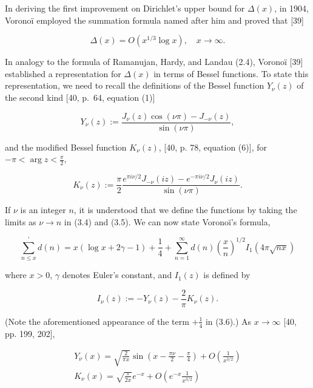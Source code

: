 \documentclass[10pt]{article}
\theoremstyle{plain}
\begin{document}
In deriving the first improvement on Dirichlet's upper bound for $\Delta(x)$, in 1904, Voronoï employed the summation formula named after him and proved that [39]


\begin{equation*}
\Delta(x)=O\left(x^{1 / 3} \log x\right), \quad x \to \infty . \tag{3.3}
\end{equation*}


In analogy to the formula of Ramanujan, Hardy, and Landau (2.4), Voronoï [39] established a representation for $\Delta(x)$ in terms of Bessel functions. To state this representation, we need to recall the definitions of the Bessel function $Y_{\nu}(z)$ of the second kind [40, p.~64, equation (1)]


\begin{equation*}
Y_{\nu}(z):=\frac{J_{\nu}(z) \cos (\nu\pi)-J_{-\nu}(z)}{\sin (\nu\pi)}, \tag{3.4}
\end{equation*}


and the modified Bessel function $K_{\nu}(z)$, [40, p. 78, equation (6)], for $-\pi<\arg z<\frac{\pi}{2}$,


\begin{equation*}
K_{\nu}(z):=\frac{\pi}{2} \frac{e^{\pi i\nu / 2} J_{-\nu}(i z)-e^{-\pi i\nu / 2} J_{\nu}(i z)}{\sin (\nu\pi)} . \tag{3.5}
\end{equation*}


If $\nu$ is an integer $n$, it is understood that we define the functions by taking the limits as $\nu \to n$ in (3.4) and (3.5). We can now state Voronoï's formula,


\begin{equation*}
\sum_{n \leq x}^{\prime} d(n)=x(\log x+2 \gamma-1)+\frac{1}{4}+\sum_{n=1}^{\infty} d(n)\left(\frac{x}{n}\right)^{1 / 2} I_{1}(4 \pi \sqrt{n x}) \tag{3.6}
\end{equation*}


where $x>0$, $\gamma$ denotes Euler's constant, and $I_{1}(z)$ is defined by


\begin{equation*}
I_{\nu}(z):=-Y_{\nu}(z)-\frac{2}{\pi} K_{\nu}(z) . \tag{3.7}
\end{equation*}


(Note the aforementioned appearance of the term $+\frac{1}{4}$ in (3.6).) As $x \to \infty$ [40, pp. 199, 202],

\begin{gather*}
Y_{\nu}(x)=\sqrt{\frac{2}{\pi x}} \sin \left(x-\frac{\pi\nu}{2}-\frac{\pi}{4}\right)+O\left(\frac{1}{x^{3 / 2}}\right)  \tag{3.8}\\
K_{\nu}(x)=\sqrt{\frac{\pi}{2 x}} e^{-x}+O\left(e^{-x} \frac{1}{x^{3 / 2}}\right) \tag{3.9}
\end{gather*}
\end{document}
